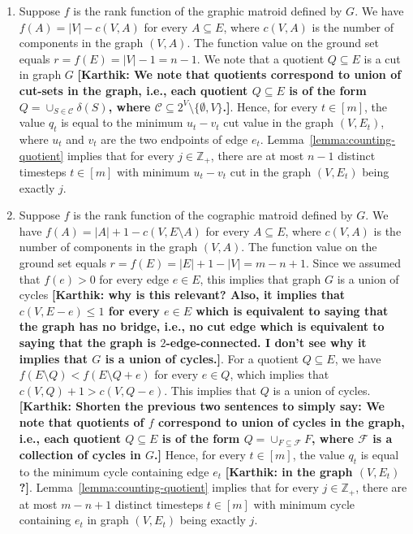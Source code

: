 \documentclass[11pt]{article}
\theoremstyle{definition}
\newcommand{\knote}[1]{{\bf{\color{blue}[\tiny Karthik: #1]}}}
\begin{document}
\begin{enumerate}
    \item Suppose $f$ is the rank function of the graphic matroid defined by $G$. We have $f(A)=|V|-c(V,A)$ for every $A\subseteq E$, where $c(V,A)$ is the number of components in the graph $(V,A)$. The function value on the ground set equals $r=f(E)=|V|-1=n-1$. We note that a quotient $Q\subseteq E$ is a cut in graph $G$ \knote{We note that quotients correspond to union of cut-sets in the graph, i.e., each quotient $Q\subseteq E$ is of the form $Q=\cup_{S\in \mathcal{C}}\delta(S)$, where $\mathcal{C}\subseteq 2^V\setminus \{\emptyset, V\}$.}. Hence, for every $t\in [m]$, the value $q_t$ is equal to the minimum $u_t-v_t$ cut value in the graph $(V,E_t)$, where $u_t$ and $v_t$ are the two endpoints of edge $e_t$. Lemma~\ref{lemma:counting-quotient} implies that for every $j\in \mathbb{Z}_+$, there are at most $n-1$ distinct timesteps $t\in [m]$ with minimum $u_t-v_t$ cut in the graph $(V, E_t)$ being exactly $j$.

    

    \item Suppose $f$ is the rank function of the cographic matroid defined by $G$. We have $f(A)=|A|+1-c(V,E\setminus A)$ for every $A\subseteq E$, where $c(V,A)$ is the number of components in the graph $(V,A)$. The function value on the ground set equals $r=f(E)=|E|+1-|V|=m-n+1$. Since we assumed that $f({e})>0$ for every edge $e\in E$, this implies that graph $G$ is a union of cycles \knote{why is this relevant? Also, it implies that $c(V, E-e)\le 1$ for every $e\in E$ which is equivalent to saying that the graph has no bridge, i.e., no cut edge which is equivalent to saying that the graph is $2$-edge-connected. I don't see why it implies that $G$ is a union of cycles.}. For a quotient $Q\subseteq E$, we have $f(E\setminus Q)<f(E\setminus Q+e)$ for every $e\in Q$, which implies that $c(V,Q)+1>c(V,Q-e)$. This implies that $Q$ is a union of cycles.\knote{Shorten the previous two sentences to simply say: We note that quotients of $f$ correspond to union of cycles in the graph, i.e., each quotient $Q\subseteq E$ is of the form $Q=\cup_{F\subseteq \mathcal{F}}F$, where $\mathcal{F}$ is a collection of cycles in $G$.} Hence, for every $t\in [m]$, the value $q_t$ is equal to the minimum cycle containing edge $e_t$ \knote{in the graph $(V, E_t)$?}. Lemma~\ref{lemma:counting-quotient} implies that for every $j\in \mathbb{Z}_+$, there are at most $m-n+1$ distinct timesteps $t\in [m]$ with minimum cycle containing $e_t$ in graph $(V,E_t)$ being exactly $j$.
\end{enumerate}
\fi
\end{document}
